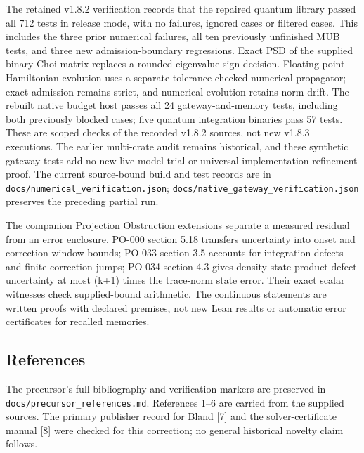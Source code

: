 \documentclass[
  10pt,
]{article}
\begin{document}
The retained v1.8.2 verification records that the repaired quantum library passed all 712 tests in release mode, with no failures, ignored cases or filtered cases. This includes the three prior numerical failures, all ten previously unfinished MUB tests, and three new admission-boundary regressions. Exact PSD of the supplied binary Choi matrix replaces a rounded eigenvalue-sign decision. Floating-point Hamiltonian evolution uses a separate tolerance-checked numerical propagator; exact admission remains strict, and numerical evolution retains norm drift. The rebuilt native budget host passes all 24 gateway-and-memory tests, including both previously blocked cases; five quantum integration binaries pass 57 tests. These are scoped checks of the recorded v1.8.2 sources, not new v1.8.3 executions. The earlier multi-crate audit remains historical, and these synthetic gateway tests add no new live model trial or universal implementation-refinement proof. The current source-bound build and test records are in \texttt{docs/numerical\_verification.json}; \texttt{docs/native\_gateway\_verification.json} preserves the preceding partial run.

The companion Projection Obstruction extensions separate a measured residual from an error enclosure. PO-000 section 5.18 transfers uncertainty into onset and correction-window bounds; PO-033 section 3.5 accounts for integration defects and finite correction jumps; PO-034 section 4.3 gives density-state product-defect uncertainty at most (k+1) times the trace-norm state error. Their exact scalar witnesses check supplied-bound arithmetic. The continuous statements are written proofs with declared premises, not new Lean results or automatic error certificates for recalled memories.

\subsection{References}\label{references}

The precursor's full bibliography and verification markers are preserved in \texttt{docs/precursor\_references.md}. References 1--6 are carried from the supplied sources. The primary publisher record for Bland {[}7{]} and the solver-certificate manual {[}8{]} were checked for this correction; no general historical novelty claim follows.
\end{document}
